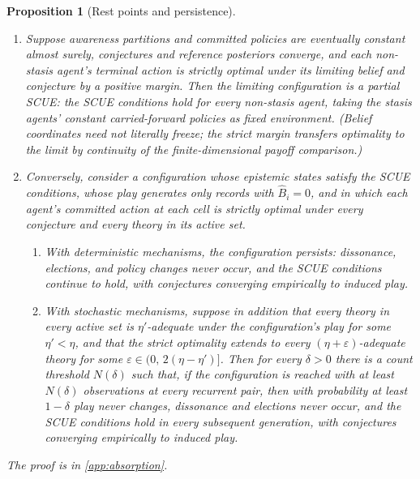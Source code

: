 \documentclass[11pt]{article}
\newtheorem{proposition}[assumption]{Proposition}
\theoremstyle{definition}
\begin{document}
\begin{proposition}[Rest points and persistence]
\label{prop:rest-points}
\leavevmode
\begin{enumerate}[label=(\roman*)]
  \item Suppose awareness partitions and committed policies are eventually
  constant almost surely, conjectures and reference posteriors converge, and
  each non-stasis agent's terminal action is strictly optimal under its
  limiting belief and conjecture by a positive margin.  Then the limiting
  configuration is a \emph{partial SCUE}: the SCUE conditions hold for every
  non-stasis agent, taking the stasis agents' constant carried-forward
  policies as fixed environment.  (Belief coordinates need not literally
  freeze; the strict margin transfers optimality to the limit by continuity of
  the finite-dimensional payoff comparison.)
  \item Conversely, consider a configuration whose epistemic states satisfy
  the SCUE conditions, whose play generates only records with
  $\widehat B_i=0$, and
  in which each agent's committed action at each cell is strictly optimal
  under every conjecture and every theory in its active set.
  \begin{enumerate}[label=(\alph*)]
    \item With deterministic mechanisms, the configuration persists:
    dissonance, elections, and policy changes never occur, and the SCUE
    conditions continue to hold, with conjectures converging empirically to
    induced play.
    \item With stochastic mechanisms, suppose in addition that every theory
    in every active set is $\eta'$-adequate under the configuration's play
    for some $\eta'<\eta$, and that the strict optimality extends to every
    $(\eta+\varepsilon)$-adequate theory for some
    $\varepsilon\in(0,\,2(\eta-\eta')]$.  Then for every $\delta>0$ there is
    a count threshold $N(\delta)$ such that, if the configuration is reached
    with at least $N(\delta)$ observations at every recurrent pair, then
    with probability at least $1-\delta$ play never changes, dissonance and
    elections never occur, and the SCUE conditions hold in every subsequent
    generation, with conjectures converging empirically to induced play.
  \end{enumerate}
\end{enumerate}
The proof is in \cref{app:absorption}.
\end{proposition}
\end{document}
